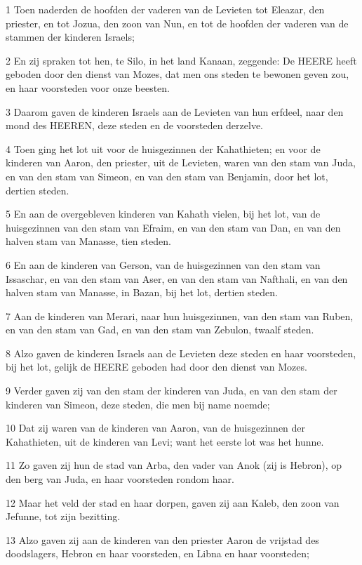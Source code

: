 \par 1 Toen naderden de hoofden der vaderen van de Levieten tot Eleazar, den priester, en tot Jozua, den zoon van Nun, en tot de hoofden der vaderen van de stammen der kinderen Israels;
\par 2 En zij spraken tot hen, te Silo, in het land Kanaan, zeggende: De HEERE heeft geboden door den dienst van Mozes, dat men ons steden te bewonen geven zou, en haar voorsteden voor onze beesten.
\par 3 Daarom gaven de kinderen Israels aan de Levieten van hun erfdeel, naar den mond des HEEREN, deze steden en de voorsteden derzelve.
\par 4 Toen ging het lot uit voor de huisgezinnen der Kahathieten; en voor de kinderen van Aaron, den priester, uit de Levieten, waren van den stam van Juda, en van den stam van Simeon, en van den stam van Benjamin, door het lot, dertien steden.
\par 5 En aan de overgebleven kinderen van Kahath vielen, bij het lot, van de huisgezinnen van den stam van Efraim, en van den stam van Dan, en van den halven stam van Manasse, tien steden.
\par 6 En aan de kinderen van Gerson, van de huisgezinnen van den stam van Issaschar, en van den stam van Aser, en van den stam van Nafthali, en van den halven stam van Manasse, in Bazan, bij het lot, dertien steden.
\par 7 Aan de kinderen van Merari, naar hun huisgezinnen, van den stam van Ruben, en van den stam van Gad, en van den stam van Zebulon, twaalf steden.
\par 8 Alzo gaven de kinderen Israels aan de Levieten deze steden en haar voorsteden, bij het lot, gelijk de HEERE geboden had door den dienst van Mozes.
\par 9 Verder gaven zij van den stam der kinderen van Juda, en van den stam der kinderen van Simeon, deze steden, die men bij name noemde;
\par 10 Dat zij waren van de kinderen van Aaron, van de huisgezinnen der Kahathieten, uit de kinderen van Levi; want het eerste lot was het hunne.
\par 11 Zo gaven zij hun de stad van Arba, den vader van Anok (zij is Hebron), op den berg van Juda, en haar voorsteden rondom haar.
\par 12 Maar het veld der stad en haar dorpen, gaven zij aan Kaleb, den zoon van Jefunne, tot zijn bezitting.
\par 13 Alzo gaven zij aan de kinderen van den priester Aaron de vrijstad des doodslagers, Hebron en haar voorsteden, en Libna en haar voorsteden;
